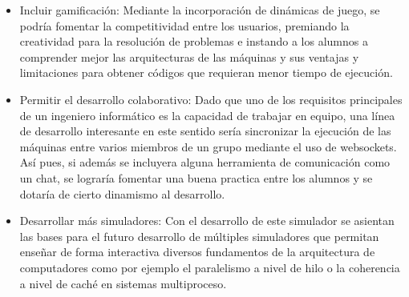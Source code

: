 \begin{itemize}
\item Incluir gamificación: Mediante la incorporación de dinámicas de juego, se podría fomentar la
competitividad entre los usuarios, premiando la creatividad para la resolución de problemas e instando
a los alumnos a comprender mejor las arquitecturas de las máquinas y sus ventajas y limitaciones para
obtener códigos que requieran menor tiempo de ejecución.

\item Permitir el desarrollo colaborativo: Dado que uno de los requisitos principales de un 
ingeniero informático es la capacidad de trabajar en equipo, una línea de desarrollo interesante
en este sentido sería sincronizar la ejecución de las máquinas entre varios miembros de un grupo
mediante el uso de websockets. Así pues, si además se incluyera alguna herramienta de comunicación
 como un chat, se lograría fomentar una buena practica entre los alumnos y se dotaría de cierto
 dinamismo al desarrollo.

\item Desarrollar más simuladores: Con el desarrollo de este simulador se asientan las bases para
el futuro desarrollo de múltiples simuladores que permitan enseñar de forma interactiva
diversos fundamentos de la arquitectura de computadores como por ejemplo el paralelismo a nivel 
de hilo o la coherencia a nivel de caché en sistemas multiproceso.

\end{itemize}